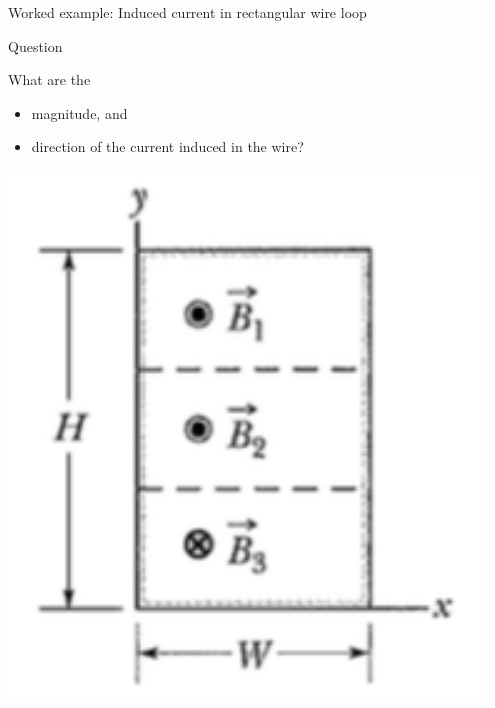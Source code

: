 {\begin{frame}{Worked example: Induced current in rectangular wire loop}
\begin{blockexmplque}{Question}
    \begin{minipage}[r]{0.30\textwidth}
      What are the
      \begin{itemize}
        \item magnitude, and
        \item direction of the current induced in the wire?
      \end{itemize}
    \end{minipage}
    \begin{minipage}[l]{0.30\textwidth}
     \begin{center}
    	 \includegraphics[width=0.95\textwidth]{./images/problems/lect08_rectangular_wire_3bfield_regions}\\
     \end{center}
    \end{minipage}
    \begin{minipage}[l]{0.38\textwidth}
     \begin{center}

\end{center}
\end{minipage}
\end{blockexmplque}
\end{frame}}
